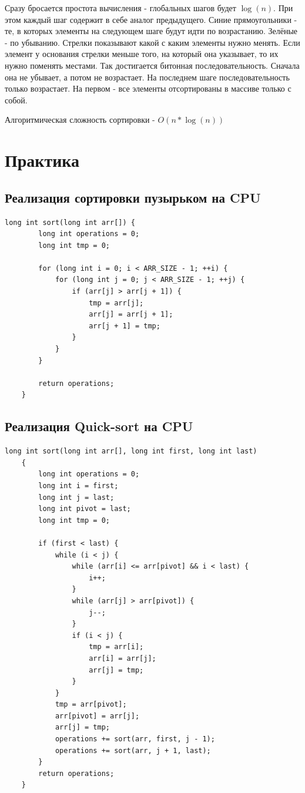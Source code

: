 \documentclass[a4paper,article]{article}
\begin{document}
    Сразу бросается простота вычисления - глобальных шагов будет $\log(n)$. При этом каждый шаг содержит в себе аналог предыдущего. Синие прямоугольники - те, в которых элементы на следующем шаге будут идти по возрастанию. Зелёные - по убыванию. Стрелки показывают какой с каким элементы нужно менять. Если элемент у основания стрелки меньше того, на который она указывает, то их нужно поменять местами. Так достигается битонная последовательность. Сначала она не убывает, а потом не возрастает. На последнем шаге последовательность только возрастает. На первом - все элементы отсортированы в массиве только с собой.

    Алгоритмическая сложность сортировки - $O(n*\log(n))$

    \newpage

    \section{Практика}

    \subsection{Реализация сортировки пузырьком на CPU}

    \begin{lstlisting}[label=cpu-bubble-sort,caption=Сортировка пузырьком на CPU]
    long int sort(long int arr[]) {
        long int operations = 0;
        long int tmp = 0;

        for (long int i = 0; i < ARR_SIZE - 1; ++i) {
            for (long int j = 0; j < ARR_SIZE - 1; ++j) {
                if (arr[j] > arr[j + 1]) {
                    tmp = arr[j];
                    arr[j] = arr[j + 1];
                    arr[j + 1] = tmp;
                }
            }
        }

        return operations;
    }
    \end{lstlisting}

    \subsection{Реализация Quick-sort на CPU}

    \begin{lstlisting}[label=cpu-quick-sort,caption=Quicksort на CPU]
    long int sort(long int arr[], long int first, long int last)
    {
        long int operations = 0;
        long int i = first;
        long int j = last;
        long int pivot = last;
        long int tmp = 0;

        if (first < last) {
            while (i < j) {
                while (arr[i] <= arr[pivot] && i < last) {
                    i++;
                }
                while (arr[j] > arr[pivot]) {
                    j--;
                }
                if (i < j) {
                    tmp = arr[i];
                    arr[i] = arr[j];
                    arr[j] = tmp;
                }
            }
            tmp = arr[pivot];
            arr[pivot] = arr[j];
            arr[j] = tmp;
            operations += sort(arr, first, j - 1);
            operations += sort(arr, j + 1, last);
        }
        return operations;
    }
    \end{lstlisting}
\end{document}
